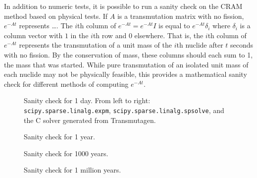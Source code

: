 In addition to numeric tests, it is possible to run a sanity check on the CRAM
method based on physical tests. If $A$ is a transmutation matrix with no
fission, $e^{-At}$ represents {\color{red}\ldots}. The $i$th column of
$e^{-At}=e^{-At}I$ is equal to $e^{-At}\delta_{i}$ where $\delta_i$ is a
column vector with $1$ in the $i$th row and $0$ elsewhere. That is, the $i$th
column of $e^{-At}$ represents the transmutation of a unit mass of the $i$th
nuclide after $t$ seconds with no fission. By the conservation of mass, these
columns should each sum to 1, the mass that was started. While pure
transmutation of an isolated unit mass of each nuclide may not be physically
feasible, this provides a mathematical sanity check for different methods of
computing $e^{-At}$.


\begin{figure}[!ht]
\centering
\resizebox{0.9\textwidth}{!}{}
\caption{Sanity check for 1 day. From left to right:
\texttt{scipy.\allowbreak{}sparse.\allowbreak{}linalg.\allowbreak{}expm},
\texttt{scipy.\allowbreak{}sparse.\allowbreak{}linalg.\allowbreak{}spsolve},
and the C solver generated from Transmutagen.}
\label{fig:nofission-pwru50-1-day}
\end{figure}

\begin{figure}[!ht]
\centering
\resizebox{0.9\textwidth}{!}{}
\caption{Sanity check for 1 year.}
\label{fig:nofission-pwru50-1-year}
\end{figure}

\begin{figure}[!ht]
\centering
\resizebox{0.9\textwidth}{!}{}
\caption{Sanity check for 1000 years.}
\label{fig:nofission-pwru50-1000-years}
\end{figure}

\begin{figure}[!ht]
\centering
\resizebox{0.9\textwidth}{!}{}
\caption{Sanity check for 1 million years.}
\label{fig:nofission-pwru50-1-million-years}
\end{figure}
